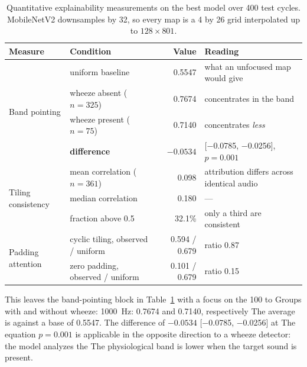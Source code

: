 \documentclass[journal,onecolumn]{IEEEtran}
\newcommand{\best}[1]{\textbf{#1}}
\begin{document}
\begin{table}[hbtp]
\centering
\caption{Quantitative explainability measurements on the best model over 400 test cycles. MobileNetV2
downsamples by 32, so every map is a 4 by 26 grid interpolated up to $128 \times 801$.}
\label{tab:xaiquant}
\footnotesize
\begin{tabular}{llrl}
\toprule
Measure & Condition & Value & Reading \\
\midrule
\multirow{4}{*}{Band pointing}
 & uniform baseline & 0.5547 & what an unfocused map would give \\
 & wheeze absent ($n = 325$) & 0.7674 & concentrates in the band \\
 & wheeze present ($n = 75$) & 0.7140 & concentrates \emph{less} \\
 & \best{difference} & \best{$-0.0534$} & [$-$0.0785, $-$0.0256], $p = 0.001$ \\
\midrule
\multirow{3}{*}{Tiling consistency}
 & mean correlation ($n = 361$) & 0.098 & attribution differs across identical audio \\
 & median correlation & 0.180 & --- \\
 & fraction above 0.5 & 32.1\% & only a third are consistent \\
\midrule
\multirow{2}{*}{Padding attention}
 & cyclic tiling, observed / uniform & 0.594 / 0.679 & ratio 0.87 \\
 & zero padding, observed / uniform & 0.101 / 0.679 & ratio 0.15 \\
\bottomrule
\end{tabular}

\vspace{2pt}
\footnotesize 
\end{table}

This leaves the band-pointing block in Table~\ref{tab:xaiquant} with a focus on the 100 to
Groups with and without wheeze: 1000~Hz: 0.7674 and 0.7140, respectively
The average is against a base of 0.5547. The difference of $-0.0534$ [$-$0.0785, $-$0.0256] at
The equation $p = 0.001$ is applicable in the opposite direction to a wheeze detector: the model analyzes the
The physiological band is lower when the target sound is present.
\end{document}
